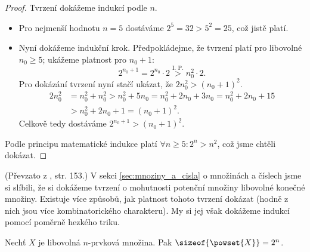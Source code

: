 \begin{proof}
    Tvrzení dokážeme indukcí podle $n$.
    \begin{itemize}
        \item Pro nejmenší hodnotu $n=5$ dostáváme $2^5=32>5^2=25$, což jistě platí.
        \item Nyní dokážeme indukční krok. Předpokládejme, že tvrzení platí pro libovolné $n_0\geq 5$; ukážeme platnost pro $n_0+1$:
        \begin{equation*}
            2^{n_0+1}=2^{n_0}\cdot 2\stackrel{\text{I. P.}}{>} n_0^2 \cdot 2.
        \end{equation*}
        Pro dokázání tvrzení nyní stačí ukázat, že $2n_0^2 > (n_0+1)^2$.
        \begin{align*}
            2n_0^2 &= n_0^2+n_0^2>n_0^2+5n_0=n_0^2+2n_0+3n_0=n_0^2+2n_0+15\\
            &>n_0^2+2n_0+1=(n_0+1)^2.
        \end{align*}
        Celkově tedy dostáváme $2^{n_0+1}>(n_0+1)^2$.
    \end{itemize}
    Podle principu matematické indukce platí $\forall n\geq 5: 2^n>n^2$, což jsme chtěli dokázat.
\end{proof}
(Převzato z \cite{ChartrandPolimeniZhang2014}, str. 153.)
V sekci \ref{sec:mnoziny_a_cisla} o množinách a číslech jsme si slíbili, že si dokážeme tvrzení o mohutnosti potenční množiny libovolné konečné množiny. Existuje více způsobů, jak platnost tohoto tvrzení dokázat (hodně z nich jsou více kombinatorického charakteru). My si jej však dokážeme indukcí pomocí poměrně hezkého triku.
\begin{proposition}
    Nechť $X$ je libovolná $n$-prvková množina. Pak $\sizeof{\powset{X}}=2^n$.
\end{proposition}
